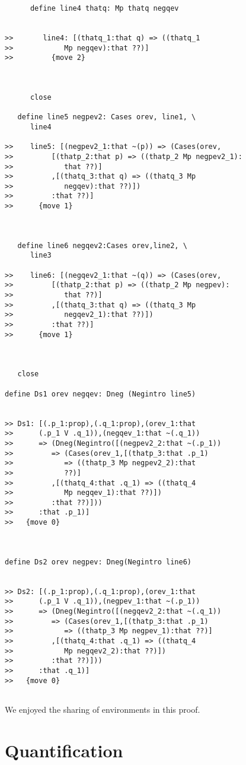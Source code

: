 \documentclass[12pt]{article}
\begin{document}
\begin{verbatim}
      define line4 thatq: Mp thatq negqev


>>       line4: [(thatq_1:that q) => ((thatq_1
>>            Mp negqev):that ??)]
>>         {move 2}



      close

   define line5 negpev2: Cases orev, line1, \
      line4

>>    line5: [(negpev2_1:that ~(p)) => (Cases(orev,
>>         [(thatp_2:that p) => ((thatp_2 Mp negpev2_1):
>>            that ??)]
>>         ,[(thatq_3:that q) => ((thatq_3 Mp
>>            negqev):that ??)])
>>         :that ??)]
>>      {move 1}



   define line6 negqev2:Cases orev,line2, \
      line3

>>    line6: [(negqev2_1:that ~(q)) => (Cases(orev,
>>         [(thatp_2:that p) => ((thatp_2 Mp negpev):
>>            that ??)]
>>         ,[(thatq_3:that q) => ((thatq_3 Mp
>>            negqev2_1):that ??)])
>>         :that ??)]
>>      {move 1}



   close

define Ds1 orev negqev: Dneg (Negintro line5)


>> Ds1: [(.p_1:prop),(.q_1:prop),(orev_1:that
>>      (.p_1 V .q_1)),(negqev_1:that ~(.q_1))
>>      => (Dneg(Negintro([(negpev2_2:that ~(.p_1))
>>         => (Cases(orev_1,[(thatp_3:that .p_1)
>>            => ((thatp_3 Mp negpev2_2):that
>>            ??)]
>>         ,[(thatq_4:that .q_1) => ((thatq_4
>>            Mp negqev_1):that ??)])
>>         :that ??)]))
>>      :that .p_1)]
>>   {move 0}



define Ds2 orev negpev: Dneg(Negintro line6)


>> Ds2: [(.p_1:prop),(.q_1:prop),(orev_1:that
>>      (.p_1 V .q_1)),(negpev_1:that ~(.p_1))
>>      => (Dneg(Negintro([(negqev2_2:that ~(.q_1))
>>         => (Cases(orev_1,[(thatp_3:that .p_1)
>>            => ((thatp_3 Mp negpev_1):that ??)]
>>         ,[(thatq_4:that .q_1) => ((thatq_4
>>            Mp negqev2_2):that ??)])
>>         :that ??)]))
>>      :that .q_1)]
>>   {move 0}


\end{verbatim}

We enjoyed the sharing of environments in this proof.


\section{Quantification}
\end{document}
